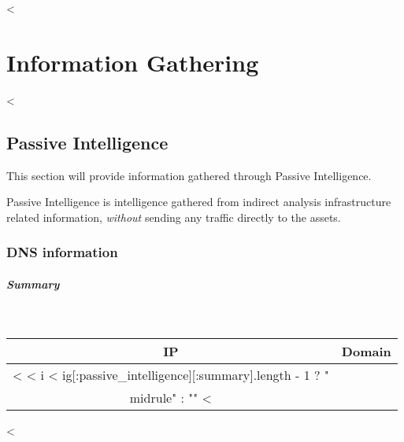 

<%


\chapter{Information Gathering}\label{ch:infogath}

  <%

  \section {Passive Intelligence}\label{sec:passiveint}

    This section will provide information gathered through Passive Intelligence.

    Passive Intelligence is intelligence gathered from indirect analysis
    infrastructure related information, \textit{without} sending any traffic
    directly to the assets.

    \subsection{DNS information}\label{sub:dnsinfo}

      \begin{itemize}
        <%
          \item \textbf{<%
            \begin{verbatim}
<%= dns_scan[:result] %>
            \end{verbatim}
        <%
      \end{itemize}

      \paragraph{Summary}~

        \begin{center}
          \begin{tabularx}{0.4\textwidth}{c c}
            \toprule
            \textbf{IP} & \textbf{Domain} \\ \midrule
            <%
              <%
                i < ig[:passive_intelligence][:summary].length - 1 ?
                "\\midrule" :
                ""
            <%
            \bottomrule
          \end{tabularx}
        \end{center}
  <%

